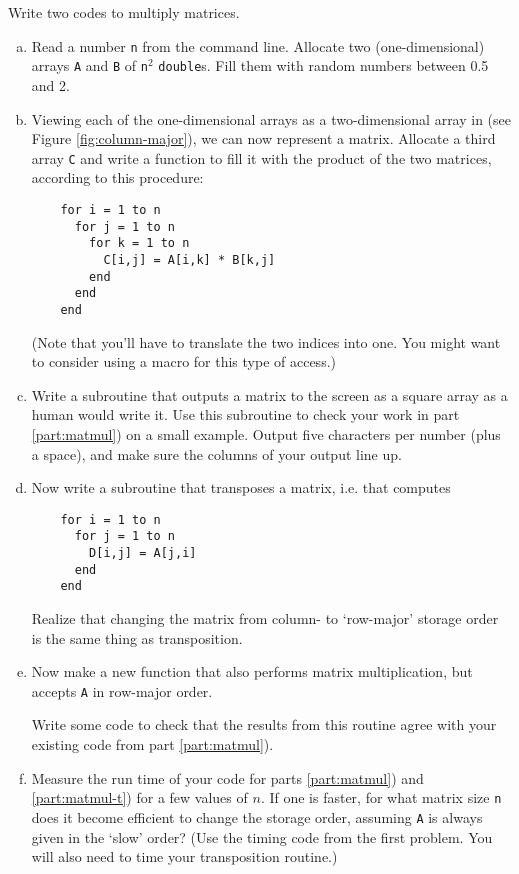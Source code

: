 \documentclass[11pt]{article}
\begin{document}
Write two codes to multiply matrices.
\begin{enumerate}[a)]
\item Read a number \texttt{n} from the command line.
  Allocate two (one-dimensional) arrays \texttt{A} and \texttt{B}
of \texttt{n}${}^2$ \texttt{double}s.  Fill them with random
numbers between 0.5 and 2.
\item \label{part:matmul}Viewing each of the one-dimensional arrays
  as a two-dimensional array in
  (see Figure \ref{fig:column-major}), we can now represent a matrix.
  Allocate a third array \texttt{C} and write a function to fill it
  with the product of the two matrices, according to this procedure:
  \begin{lstlisting}
    for i = 1 to n
      for j = 1 to n
        for k = 1 to n
          C[i,j] = A[i,k] * B[k,j]
        end
      end
    end
  \end{lstlisting}
  (Note that you'll have to translate the two indices into one. You
  might want to consider using a macro for this type of access.)

\item \label{part:mat-output}Write a subroutine that outputs a matrix to the screen
  as a square array as a human would write it.
  Use this subroutine to check your work in part \ref{part:matmul})
  on a small example.
  Output five characters per number (plus a space), and make sure the
  columns of your output line up.

\item Now write a subroutine that transposes a matrix, i.e. that
  computes
  \begin{lstlisting}
    for i = 1 to n
      for j = 1 to n
        D[i,j] = A[j,i]
      end
    end
  \end{lstlisting}
  Realize that changing the matrix from column- to `row-major' storage
  order is the same thing as transposition.

\item \label{part:matmul-t} Now make a new function
  that also performs matrix multiplication, but accepts
  \texttt{A} in row-major order.

  Write some code to check that the results from this routine agree
  with your existing code from part \ref{part:matmul}).

\item \label{part:mat-perf}Measure the run time of your code for parts \ref{part:matmul})
  and \ref{part:matmul-t}) for a few values of $n$. If one is faster,
  for what matrix size \texttt{n} does it become efficient to change the
  storage order, assuming \texttt{A} is always given in the `slow'
  order? (Use the timing code from the first problem. You will also
  need to time your transposition routine.)


\end{enumerate}
\end{document}
